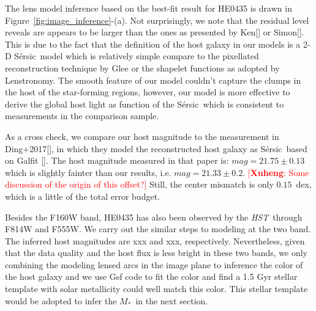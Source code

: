 \documentclass[fleqn,usenatbib]{mnras}
\newcommand{\hst}{{\it HST}}
\newcommand{\sersic}{S\'ersic}
\newcommand{\lenstronomy}{{\sc Lenstronomy}}
\newcommand{\mstar}{{$M_*$}}
\newcommand{\ding}[1]{\textcolor{red}{[{\bf Xuheng}: #1]}}
\begin{document}
The lens model inference based on the best-fit result for HE0435 is drawn in Figure~\ref{fig:image_inference}-(a). Not surprisingly, we note that the residual level reveals are appears to be larger than the ones as presented by Ken[] or Simon[]. This is due to the fact that the definition of the host galaxy in our models is a 2-D \sersic\ model which is relatively simple compare to the pixellated reconstruction technique by {\sc Glee} or the shapelet functions as adopted by \lenstronomy. The smooth feature of our model couldn't capture the clumps in the host of the star-forming regions, however, our model is more effective to derive the global host light as function of the \sersic\ which is consistent to measurements in the comparison sample. 

As a cross check, we compare our host magnitude to the measurement in Ding+2017[], in which they model the reconstructed host galaxy as \sersic\ based on Galfit []. The host magnitude measured in that paper is: $mag = 21.75 \pm 0.13$%
which is slightly fainter than our results, i.e. $mag = 21.33 \pm 0.2$. \ding{Some discussion of the origin of this offset?}
Still, the center mismatch is only $0.15$~dex, which is a little of the total error budget.

Besides the F160W band, HE0435 has also been observed by the \hst\ through F814W and F555W. We carry out the similar steps to modeling at the two band. The inferred host magnitudes are xxx and xxx, respectively. Nevertheless, given that the data quality and the host flux is less bright in these two bands, we only combining the modeling lensed arcs in the image plane to inference the color of the host galaxy and we use {\sc Gsf} code to fit the color and find a 1.5 Gyr stellar template with solar metallicity could well match this color. This stellar template would be adopted to infer the \mstar\ in the next section.
\end{document}
